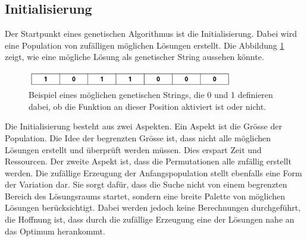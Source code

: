 %
%
%
%
\subsection{Initialisierung
\label{buch:paper:varalg:subsection:initialization}}
%
Der Startpunkt eines genetischen Algorithmus ist die Initialisierung.
Dabei wird eine Population von zufälligen möglichen Lösungen erstellt.
Die Abbildung \ref{fig:possible_genetic_string} zeigt, wie eine mögliche
Lösung als genetischer String aussehen könnte.
\begin{figure}
	\centering
	\includegraphics[width=0.8\textwidth]{
        papers/varalg/images/teil3/01GeneticString.png
        }
	\caption{
		Beispiel eines möglichen genetischen Strings, die 0 und 1 definieren dabei,
		ob die Funktion an dieser Position aktiviert ist oder nicht.
		}
	\label{fig:possible_genetic_string}
\end{figure}
Die Initialisierung besteht aus zwei Aspekten. Ein Aspekt ist die Grösse
der Population. Die Idee der begrenzten Grösse ist, dass nicht alle möglichen
Lösungen erstellt und überprüft werden müssen. Dies erspart Zeit und Ressourcen.
Der zweite Aspekt ist, dass die Permutationen alle zufällig erstellt werden.
Die zufällige Erzeugung der Anfangspopulation stellt ebenfalls eine Form 
der Variation dar. Sie sorgt dafür, dass die Suche nicht von einem begrenzten 
Bereich des Lösungsraums startet, sondern eine breite Palette von möglichen 
Lösungen berücksichtigt. Dabei werden jedoch keine Berechnungen durchgeführt,
die Hoffnung ist, dass durch die zufällige Erzeugung eine der Lösungen nahe
an das Optimum herankommt.

